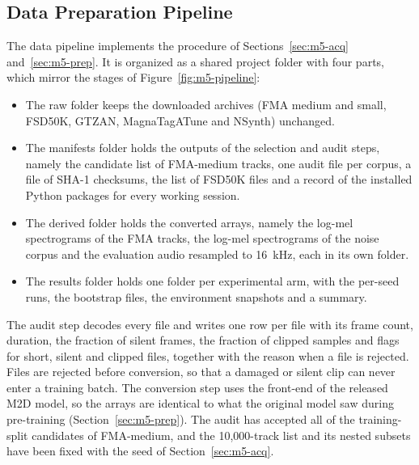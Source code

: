 \subsection{Data Preparation Pipeline}
\label{sec:impl-data}
The data pipeline implements the procedure of Sections~\ref{sec:m5-acq} and~\ref{sec:m5-prep}. It is organized as a shared project folder with four parts, which mirror the stages of Figure~\ref{fig:m5-pipeline}:
\begin{itemize}
  \item The raw folder keeps the downloaded archives (FMA medium and small, FSD50K, GTZAN, MagnaTagATune and NSynth) unchanged.
  \item The manifests folder holds the outputs of the selection and audit steps, namely the candidate list of FMA-medium tracks, one audit file per corpus, a file of SHA-1 checksums, the list of FSD50K files and a record of the installed Python packages for every working session.
  \item The derived folder holds the converted arrays, namely the log-mel spectrograms of the FMA tracks, the log-mel spectrograms of the noise corpus and the evaluation audio resampled to 16~kHz, each in its own folder.
  \item The results folder holds one folder per experimental arm, with the per-seed runs, the bootstrap files, the environment snapshots and a summary.
\end{itemize}
The audit step decodes every file and writes one row per file with its frame count, duration, the fraction of silent frames, the fraction of clipped samples and flags for short, silent and clipped files, together with the reason when a file is rejected. Files are rejected before conversion, so that a damaged or silent clip can never enter a training batch. The conversion step uses the front-end of the released M2D model, so the arrays are identical to what the original model saw during pre-training (Section~\ref{sec:m5-prep}). The audit has accepted all of the training-split candidates of FMA-medium, and the 10,000-track list and its nested subsets have been fixed with the seed of Section~\ref{sec:m5-acq}.

